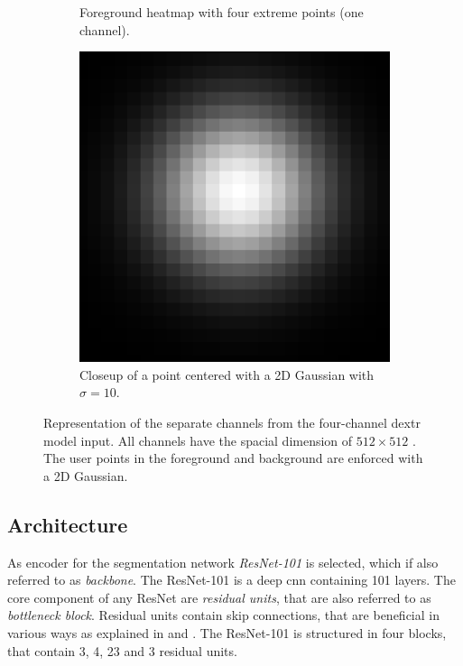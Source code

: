 \begin{figure}
\begin{subfigure}[b]{0.3\textwidth}
		\caption{Foreground heatmap with four extreme points (one channel).}
		\label{fig:ch3:sec3:fg_channel}
	\end{subfigure}
	\hfill
	\begin{subfigure}[b]{0.3\textwidth}
		\centering
		\includegraphics[width=\textwidth]{figures/chap33_gaussian_point.png}
		\caption{Closeup of a point centered with a 2D Gaussian with $\sigma = 10$.}
		\label{fig:ch3:sec3:gauss_centered_point}
	\end{subfigure}
	\caption[Four-channel DEXTR model input]{
		Representation of the separate channels from the four-channel \gls{dextr} model input.
		All channels have the spacial dimension of $512 \times 512$ .
		The user points in the foreground and background are enforced with a 2D Gaussian.
	} \label{fig:ch3:sec3:model_input_channels}
\end{figure}


\subsection{Architecture}\label{ord:ch3:sec3:subsec3}

As encoder for the segmentation network \textit{ResNet-101} \cite{He16-ResNet} is selected, which if also referred to as \textit{backbone}.
The ResNet-101 is a deep \gls{cnn} containing 101 layers.
The core component of any ResNet are \textit{residual units}, that are also referred to as \textit{bottleneck block}.
Residual units contain skip connections, that are beneficial in various ways as explained in \cite{He16-ResNet} and \cite{Ger17-HandsOn}.
The ResNet-101 is structured in four blocks, that contain 3, 4, 23 and 3 residual units.

